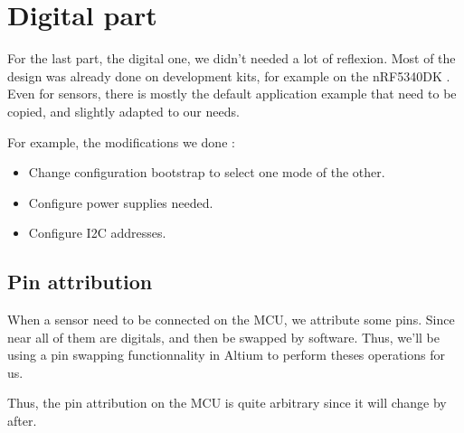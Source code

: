 \section{Digital part}
For the last part, the digital one, we didn't needed a lot of reflexion. Most of
the design was already done on development kits, for example on the nRF5340DK
\cite{nRF5340DK}. Even for sensors, there is mostly the default
application example that need to be copied, and slightly adapted to our needs.

For example, the modifications we done :
\begin{itemize}
    \item   Change configuration bootstrap to select one mode of the other.
    \item   Configure power supplies needed.
    \item   Configure I2C addresses.
\end{itemize}

\subsection{Pin attribution}
When a sensor need to be connected on the MCU, we attribute some pins. Since near
all of them are digitals, and then be swapped by software. Thus, we'll be using a
pin swapping functionnality in Altium to perform theses operations for us.

Thus, the pin attribution on the MCU is quite arbitrary since it will change by after.